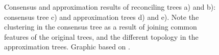 \begin{figure}[t]
	\centering
	\def\svgwidth{0.8\textwidth}
	
	\caption[Consensus and approximation trees]{
		Consensus and approximation results of reconciling trees a) and b):
		consensus tree c) and approximation trees d) and e). Note the clustering in
		the consensus tree as a result of joining common features of the original
		trees, and the different topology in the approximation trees. Graphic
		based on \cite{mirkin1995}.
	}
	\label{fig:consens-approx}
\end{figure}
